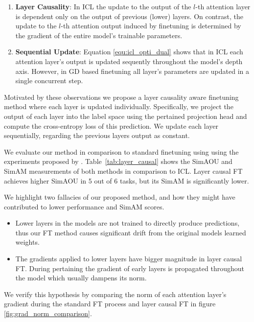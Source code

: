 \begin{enumerate}
	\item \textbf{Layer Causality}: In ICL the update to the output of the $l$-th attention layer is dependent only on the output of previous (lower) layers.
  On contrast, the update to the $l$-th attention output induced by finetuning is determined by the gradient of the entire model's trainable parameters.
	
  \item \textbf{Sequential Update}: Equation \ref{equ:icl_opti_dual} shows that in ICL each attention layer's output is updated sequently throughout the model's depth axis.
  However, in GD based finetuning all layer's parameters are updated in a single concurrent step.
\end{enumerate}

Motivated by these observations we propose a layer causality aware finetuning method where each layer is updated individually.
Specifically, we project the output of each layer into the label space using the pertained projection head and compute the cross-entropy loss of this prediction.
We update each layer sequentially, regarding the previous layers output as constant.  

We evaluate our method in comparison to standard finetuning using using the experiments proposed by \cite{dai2023gpt}.
Table~\ref{tab:layer_causal} shows the SimAOU and SimAM measurements of both methods in comparison to ICL.
Layer causal FT achieves higher SimAOU in 5 out of 6 tasks, but its SimAM is significantly lower.

We highlight two fallacies of our proposed method, and how they might have contributed to lower performance and SimAM scores.
\begin{itemize}
	\item Lower layers in the models are not trained to directly produce predictions, thus our FT method causes significant drift from the original models learned weights.
	\item The gradients applied to lower layers have bigger magnitude in layer causal FT.
				During pertaining the gradient of early layers is propagated throughout the model which usually dampens its norm.  
\end{itemize}

We verify this hypothesis by comparing the norm of  each attention layer's gradient during the standard FT process and layer causal FT in figure \ref{fig:grad_norm_comparison}.

